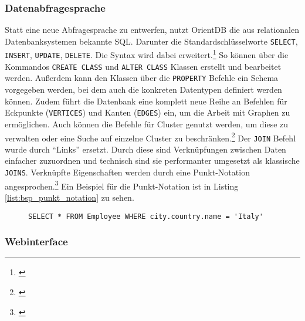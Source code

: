 \subsubsection{Datenabfragesprache}


Statt eine neue Abfragesprache zu entwerfen, nutzt OrientDB die aus relationalen Datenbanksystemen bekannte \gls{SQL}. Darunter die Standardschlüsselworte \texttt{SELECT}, \texttt{INSERT}, \texttt{UPDATE}, \texttt{DELETE}. Die Syntax wird dabei erweitert.\footnote{\cite[Vgl.][]{OrientDBSQL}} So können über die Kommandos \texttt{CREATE CLASS} und \texttt{ALTER CLASS} Klassen erstellt und bearbeitet werden. Außerdem kann den Klassen über die \texttt{PROPERTY} Befehle ein Schema vorgegeben werden, bei dem auch die konkreten Datentypen definiert werden können. Zudem führt die Datenbank eine komplett neue Reihe an Befehlen für Eckpunkte (\texttt{VERTICES}) und Kanten (\texttt{EDGES}) ein, um die Arbeit mit Graphen zu ermöglichen. Auch können die Befehle für Cluster genutzt werden, um diese zu verwalten oder eine Suche auf einzelne Cluster zu beschränken.\footnote{\cite[Vgl.][]{OrientDBCommands}} Der \texttt{JOIN} Befehl wurde durch \enquote{Links} ersetzt. Durch diese sind Verknüpfungen zwischen Daten einfacher zuzuordnen und technisch sind sie performanter umgesetzt als klassische \texttt{JOINS}. Verknüpfte Eigenschaften werden durch eine Punkt-Notation angesprochen.\footnote{\cite[Vgl.][]{OrientDBSQL}} Ein Beispiel für die Punkt-Notation ist in Listing \ref{list:bsp_punkt_notation} zu sehen.

\begin{figure}[!htb]
    \begin{lstlisting}[caption=Beispiel der Punkt-Notation mit OrientDB Links, label=list:bsp_punkt_notation]
SELECT * FROM Employee WHERE city.country.name = 'Italy'
    \end{lstlisting}
\end{figure}


\subsubsection{Webinterface}

